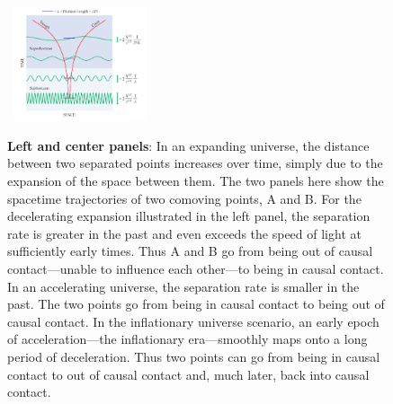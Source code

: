 \begin{figure}[ht]
\begin{center}
\,
\includegraphics[width=0.349\textwidth]{Inflation/QuantumFluctuationsCropped.png}
\end{center}
\caption{{\bf Left and center panels}: In an expanding universe, the distance between two separated points increases over time, simply due to the expansion of the space between them. The two panels here show the spacetime trajectories of two comoving points, A and B. For the decelerating expansion illustrated in the left panel, the separation rate is greater in the past and even exceeds the speed of light at sufficiently early times. Thus A and B go from being out of causal contact---unable to influence each other---to being in causal contact. In an accelerating universe, the separation rate is smaller in the past. The two points go from being in causal contact to being out of causal contact. In the inflationary universe scenario, an early epoch of acceleration---the inflationary era---smoothly maps onto a long period of deceleration. Thus two points can go from being in causal contact to out of causal contact and, much later, back into causal contact. \newline
}
\end{figure}
